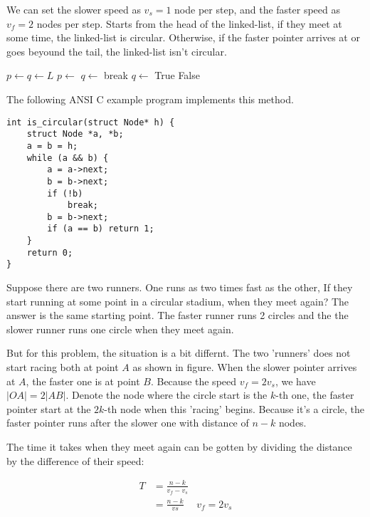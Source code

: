 \documentclass{article}
\begin{document}
We can set the slower speed as $v_s = 1$ node per step,
and the faster speed as $v_f = 2$ nodes per step. Starts from the head of the linked-list, if they
meet at some time, the linked-list is circular. Otherwise, if the faster pointer
arrives at or goes beyound the tail, the linked-list isn't circular.

\begin{algorithmic}[1]
  \State $p \gets q \gets L$
    \State $p \gets$ 
    \State $q \gets$ 
      \State break
    \EndIf
    \State $q \gets$ 
      \State \Return True
    \EndIf
  \EndWhile
  \State \Return False
\EndFunction
\end{algorithmic}

The following ANSI C example program implements this method.

\lstset{language=C}
\begin{lstlisting}
int is_circular(struct Node* h) {
    struct Node *a, *b;
    a = b = h;
    while (a && b) {
        a = a->next;
        b = b->next;
        if (!b)
            break;
        b = b->next;
        if (a == b) return 1;
    }
    return 0;
}
\end{lstlisting}

Suppose there are two runners. One runs as two times fast as the other, If they start
running at some point in a circular stadium, when they meet again? The answer is the
same starting point. The faster runner runs 2 circles and the the slower runner runs
one circle when they meet again.

But for this problem, the situation is a bit differnt. The two 'runners' does not
start racing both at point $A$ as shown in figure. When the slower pointer arrives
at $A$, the faster one is at point $B$. Because the speed $v_f = 2v_s$, we have
$|OA| = 2 |AB|$. Denote the node where the circle start is the $k$-th one, the
faster pointer start at the $2k$-th node when this 'racing' begins. Because it's
a circle, the faster pointer runs after the slower one with distance of $n-k$ nodes.

The time it takes when they meet again can be gotten by dividing the distance by
the difference of their speed:

\begin{equation}
\begin{array}{rll}
T & = \frac{n-k}{v_f - v_s} & \\
  & = \frac{n-k}{vs} & v_f = 2v_s
\end{array}
\end{equation}
\end{document}
